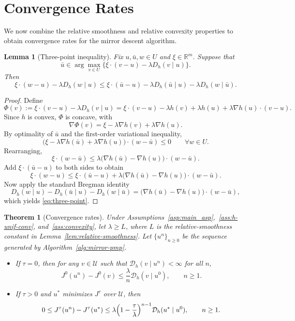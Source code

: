 \documentclass[11pt]{amsart}
\theoremstyle{plain}
\newtheorem{theorem}{Theorem}
\newtheorem{lemma}{Lemma}
\theoremstyle{definition}
\theoremstyle{remark}
\begin{document}
\section{Convergence Rates}\label{sec:conv_rates}

We now combine the relative smoothness and relative convexity properties to obtain convergence rates for the mirror descent algorithm.

\begin{lemma}[Three-point inequality]\label{lem:three-point}
Fix $u,\bar u,w\in U$ and $\xi\in\mathbb R^m$. Suppose that
\[
\bar u \in \arg\max_{v\in U}\bigl\{\xi\cdot (v-u) - \lambda D_h(v\mid u)\bigr\}.
\]
Then
\begin{equation}\label{eq:three-point}
\xi\cdot (w-u)- \lambda D_h(w\mid u)
\le
\xi\cdot (\bar u-u) - \lambda D_h(\bar u\mid u) - \lambda D_h(w\mid \bar u).
\end{equation}
\end{lemma}

\begin{proof}
Define
\[
\Phi(v):=\xi\cdot (v-u) - \lambda D_h(v\mid u)
=
\xi\cdot(v-u) - \lambda h(v) + \lambda h(u) + \lambda \nabla h(u)\cdot(v-u).
\]
Since $h$ is convex, $\Phi$ is concave, with
\[
\nabla \Phi(v)=\xi - \lambda \nabla h(v) + \lambda \nabla h(u).
\]
By optimality of $\bar u$ and the first-order variational inequality,
\[
\bigl(\xi - \lambda \nabla h(\bar u) + \lambda \nabla h(u)\bigr)\cdot (w-\bar u)\le 0
\qquad \forall w\in U.
\]
Rearranging,
\[
\xi\cdot (w-\bar u)
\le
\lambda\bigl(\nabla h(\bar u)-\nabla h( u)\bigr)\cdot (w-\bar u).
\]
Add $\xi\cdot(\bar u-u)$ to both sides to obtain
\[
\xi\cdot (w-u)
\le
\xi\cdot(\bar u-u) +
\lambda\bigl(\nabla h(\bar u)-\nabla h(u)\bigr)\cdot (w-\bar u).
\]
Now apply the standard Bregman identity
\[
D_h(w\mid u)-D_h(\bar u\mid u)-D_h(w\mid \bar u)
=
\bigl(\nabla h(\bar u)-\nabla h(u)\bigr)\cdot (w-\bar u),
\]
which yields \eqref{eq:three-point}.
\end{proof}

\begin{theorem}[Convergence rates]\label{thm:rates}
Under Assumptions~\ref{asp:main_asp},~\ref{ass:h-unif-conv}, and~\ref{ass:convexity}, let $\lambda\ge L$, where $L$ is the relative-smoothness constant in Lemma~\ref{lem:relative-smoothness}. Let $\{u^n\}_{n\ge 0}$ be the sequence generated by Algorithm~\ref{alg:mirror-pmp}.

\begin{itemize}
\item[(i)] If $\tau=0$, then for any $v\in\mathcal U$ such that $\mathcal{D}_h(v\mid u^n)<\infty$ for all $n$,
\[
J^0(u^n)-J^0(v)\le \frac{\lambda}{n}\mathcal{D}_h(v\mid u^0),\qquad n\ge 1.
\]

\item[(ii)] If $\tau>0$ and $u^\ast$ minimizes $J^\tau$ over $\mathcal U$, then
\[
0\le J^\tau(u^n)-J^\tau(u^\ast)
\le
\lambda\Bigl(1-\frac{\tau}{\lambda}\Bigr)^{n-1} \mathcal{D}_h(u^\ast\mid u^0),
\qquad n\ge 1.
\]
\end{itemize}
\end{theorem}
\end{document}
